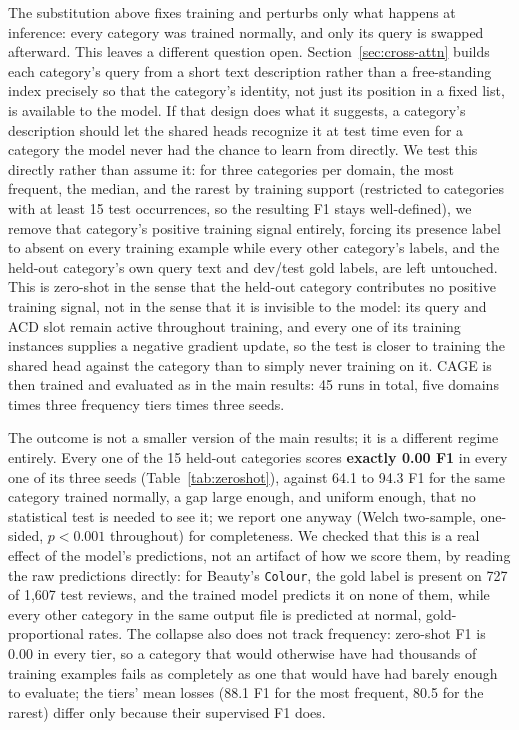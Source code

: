 The substitution above fixes training and perturbs only what happens at
inference: every category was trained normally, and only its query is
swapped afterward. This leaves a different question open. Section~\ref{sec:cross-attn}
builds each category's query from a short text description rather than a
free-standing index precisely so that the category's identity, not just its
position in a fixed list, is available to the model. If that design does
what it suggests, a category's description should let the shared heads
recognize it at test time even for a category the model never had the
chance to learn from directly. We test this
directly rather than assume it: for three categories per domain, the most
frequent, the median, and the rarest by training support (restricted to
categories with at least 15 test occurrences, so the resulting F1 stays
well-defined), we remove that category's positive training signal entirely,
forcing its presence label to absent on every training example while every
other category's labels, and the held-out category's own query text and
dev/test gold labels, are left untouched. This is zero-shot in the sense
that the held-out category contributes no positive training signal, not in
the sense that it is invisible to the model: its query and ACD slot remain
active throughout training, and every one of its training instances
supplies a negative gradient update, so the test is closer to training the
shared head against the category than to simply never training on it. CAGE
is then trained and evaluated as in the main results: 45 runs in total, five
domains times three frequency tiers times three seeds.

The outcome is not a smaller version of the main results; it is a different
regime entirely. Every one of the 15 held-out categories scores
\textbf{exactly 0.00 F1} in every one of its three seeds
(Table~\ref{tab:zeroshot}), against 64.1 to 94.3 F1 for the same category
trained normally, a gap large enough, and uniform enough, that no
statistical test is needed to see it; we report one anyway (Welch
two-sample, one-sided, $p<0.001$ throughout) for completeness. We checked
that this is a real effect of the model's predictions, not an artifact of how we
score them, by reading the raw predictions directly: for Beauty's
\texttt{Colour}, the gold label is present on 727 of 1,607 test reviews, and
the trained model predicts it on none of them, while every other category
in the same output file is predicted at normal, gold-proportional rates. The
collapse also does not track frequency: zero-shot F1 is 0.00 in every tier, so a
category that would otherwise have had thousands of training examples fails as
completely as one that would have had barely enough to evaluate; the tiers' mean
losses (88.1 F1 for the most frequent, 80.5 for the rarest) differ only because
their supervised F1 does.

